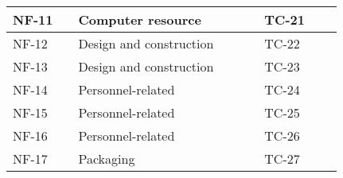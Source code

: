 \begin{sidewaystable}
\begin{longtable}{| p{1.1cm}  | p{2cm}  | p{5cm} |  p{1.5cm}  | p{1.5cm}  |  p{1.5cm}  | p{1.5cm}  |  p{1.5cm}  | p{2cm}  |  }
		NF-11&& Computer resource&&&& TC-21 && \\ \hline
		NF-12&& Design and construction&&&& TC-22 && \\ \hline
		NF-13&& Design and construction&&&& TC-23 && \\ \hline
		NF-14&& Personnel-related&&&& TC-24 && \\ \hline
		NF-15&& Personnel-related&&&& TC-25 && \\ \hline
		NF-16&& Personnel-related&&&& TC-26 && \\ \hline
		NF-17&& Packaging&&&& TC-27 && \\ \hline
	\end{longtable}
\end{sidewaystable}